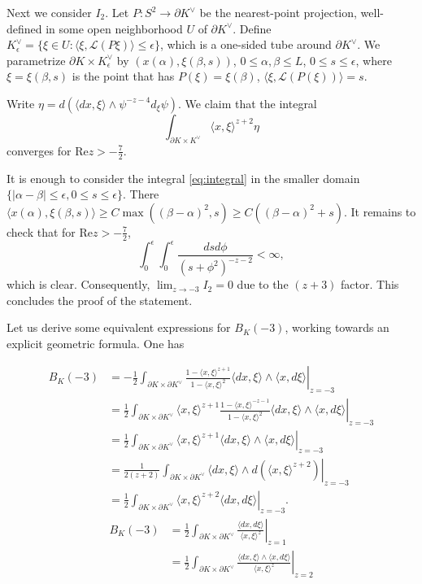 \documentclass[reqno,10pt]{amsart}
\renewcommand{\Re}{\mathrm {Re}}
\begin{document}
Next we consider $I_2$. Let $P: S^2\to \partial K^\vee$ be the nearest-point projection, well-defined in some open neighborhood $U$ of $\partial K^\vee$. Define $K^\vee_\epsilon=\{\xi\in U: \langle \xi, \mathcal L(P\xi)\rangle \leq \epsilon\}$, which is a one-sided tube around $\partial K^\vee$.
We parametrize $\partial K\times K^\vee_\epsilon$ by $(x(\alpha), \xi(\beta, s))$, $0\leq \alpha,\beta\leq L$, $0\leq s\leq \epsilon$, where $\xi=\xi(\beta, s)$ is the point that has $P(\xi)=\xi(\beta)$, $\langle \xi, \mathcal L (P(\xi))\rangle=s$. 

Write $\eta=d(\langle dx,\xi\rangle \wedge\psi^{-z-4}d_\xi\psi)$. We claim that the integral 
\begin{equation}\label{eq:integral}\int_{\partial K\times K^\vee}\langle x,\xi\rangle^{z+2}\eta\end{equation}
converges for $\Re z>-\frac 72$. 

It is enough to consider the integral \eqref{eq:integral} in the smaller domain $\{|\alpha-\beta|\leq \epsilon, 0\leq s\leq \epsilon\}$. There $\langle x(\alpha), \xi(\beta, s)\rangle \geq C\max((\beta-\alpha)^2, s)\geq C((\beta-\alpha)^2+s) $. 
It remains to check that for $\Re z>-\frac72$,
\[ \int_0^\epsilon\int_0^\epsilon\frac{dsd\phi}{(s+\phi^2)^{-z-2}}<\infty,  \]
which is clear. Consequently, $\lim_{z\to -3} I_2=0$ due to the $(z+3)$ factor. This concludes the proof of the statement.

\endproof

Let us derive some equivalent expressions for $B_K(-3)$, working towards an explicit geometric formula. One has

\begin{align*}B_K(-3)&=-\frac12\left. \int_{\partial K\times\partial K^\vee}\frac{1-\langle x,\xi\rangle^{z+1}}{1-\langle x,\xi\rangle ^2}\langle dx,\xi\rangle\wedge\langle x,d\xi\rangle\right|_{z=-3} \\&=\frac12 \left.\int_{\partial K\times\partial K^\vee}\langle x,\xi\rangle^{z+1} \frac{1-\langle x,\xi\rangle^{-z-1}}{1-\langle x,\xi\rangle ^2}\langle dx,\xi\rangle\wedge\langle x,d\xi\rangle\right|_{z=-3}\\&=\frac12  \left.\int_{\partial K\times\partial K^\vee}\langle x,\xi\rangle^{z+1}\langle dx,\xi\rangle\wedge\langle x,d\xi\rangle\right|_{z=-3}
	\\&=\frac1{2(z+2)}\left.\int_{\partial K\times\partial K^\vee}\langle dx,\xi\rangle \wedge d(\langle x, \xi\rangle^{z+2})\right|_{z=-3}
	\\&=\frac1{2}\left.\int_{\partial K\times\partial K^\vee}\langle x,\xi\rangle^{z+2}\langle dx,d\xi\rangle\right|_{z=-3}.
\end{align*}
\begin{align}B_K(-3)&=\frac1{2}\left.\int_{\partial K\times\partial K^\vee}\frac{\langle dx,d\xi\rangle}{\langle x,\xi\rangle^z}\right|_{z=1}
	\label{eq:mahler_volume} 
	\\&=\frac12\left.\int_{\partial K\times\partial K^\vee} \frac{\langle dx,\xi\rangle\wedge \langle x,d\xi\rangle}{\langle x,\xi\rangle^z}\right|_{z=2}\label{eq:mahler_volume2} 
\end{align}
\end{document}
